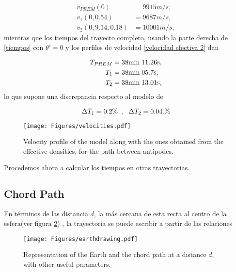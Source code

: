\documentclass[aps,twocolumn,showpacs,preprintnumbers]{revtex4}
\begin{document}
    \begin{align*}
        v_{PREM}(0) &= 9915 m/s, \\
        v_1 (0,0.54)&= 9687 m/s ,\\
        v_2 (0,9.14,0.18) &=10001 m/s,
    \end{align*}
    mientras que los tiempos del trayecto completo, usando la parte derecha de \eqref{tiempos} con $\theta'=0$ y los perfiles de velocidad \eqref{velocidad efectiva 2} dan
    
    \begin{align*}
        T_{PREM} &= 38 \text{min} \hspace{0.1cm} 11.26 \text{s}, \\
        T_1 &= 38 \text{min}  \hspace{0.1cm} 05.7 \text{s},\\
        T_2 &= 38 \text{min} \hspace{0.1cm} 13.01 \text{s} ,
    \end{align*}
    lo que supone una discrepancia respecto al modelo de
    
    \begin{equation*}
        \Delta T_1 = 0.2\% \hspace{0.2cm}, \hspace{0.2cm}\Delta T_2 = 0.04. \%
    \end{equation*}
    
    \begin{figure}
        \centering
        \texttt{[image: Figures/velocities.pdf]}
        \caption{Velocity profile of the model along with the ones obtained from the effective densities, for the path between antipodes.}
        \label{fig:velocity}
    \end{figure}
    
    Procedemos ahora a calcular los tiempos en otras trayectorias.
            
    \subsection{Chord Path}
    
        En términos de las distancia $d$, la más cercana de esta recta al centro de la esfera(ver figura \ref{fig:Earth drawing}) , la trayectoria se puede escribir a partir de las relaciones
            
        \begin{figure}
            \centering
            \texttt{[image: Figures/earthdrawing.pdf]}
            \caption{Representation of the Earth and the chord path at a distance $d$, with other useful parameters.}
            \label{fig:Earth drawing}
        \end{figure}    
            
\end{document}
